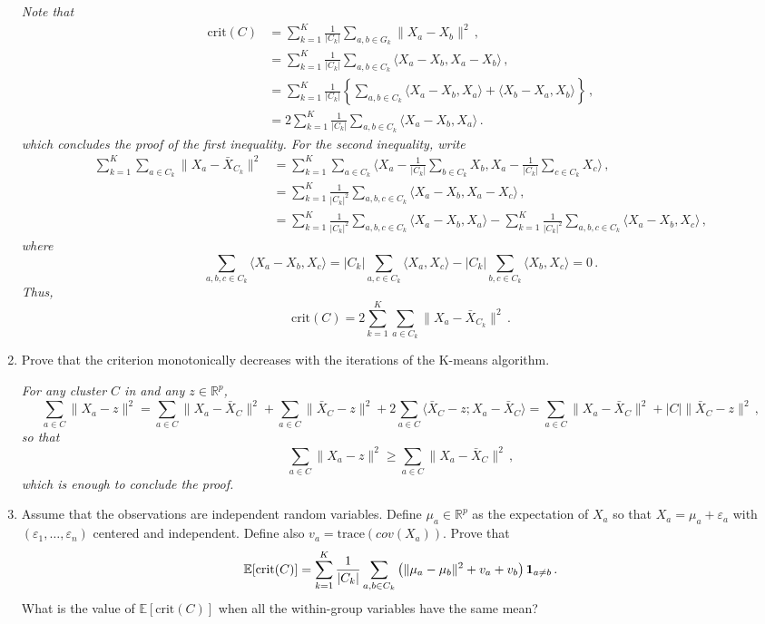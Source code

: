 \begin{enumerate}
\vspace{.2cm}

{\em
Note that 
\begin{align*}
\textrm{crit}(C) & = \sum_{k=1}^K \frac{1}{|C_k|}\sum_{a, b\in G_{k}} \| X_a-X_b \|^2\,,\\
&=\sum_{k=1}^K \frac{1}{|C_k|}\sum_{a, b\in C_{k}} \langle X_a-X_b,X_a -X_b \rangle \,,\\
&=\sum_{k=1}^K \frac{1}{|C_k|}\left\{\sum_{a, b\in C_{k}} \langle X_a-X_b,X_a \rangle + \langle X_b-X_a,X_b \rangle\right\} \,,\\
&=2\sum_{k=1}^K \frac{1}{|C_k|}\sum_{a, b\in C_{k}} \langle X_a-X_b,X_a\rangle\,.
\end{align*}
which concludes the proof of the first inequality. For the second inequality, write
\begin{align*}
\sum_{k=1}^K\sum_{a\in C_{k}}\|X_{a}-\bar{X}_{C_{k}}\|^2 & = \sum_{k=1}^K \sum_{a\in C_{k}} \langle X_a - \frac{1}{|C_k|} \sum_{b \in C_k} X_b,X_a - \frac{1}{|C_k|} \sum_{c \in C_k} X_c \rangle\,, \\
& = \sum_{k=1}^K \frac{1}{|C_k|^2}\sum_{a, b, c\in C_{k}} \langle X_a - X_b,X_a - X_c \rangle\,, \\
& = \sum_{k=1}^K \frac{1}{|C_k|^2}\sum_{a, b, c\in C_{k}} \langle X_a - X_b,X_a \rangle - \sum_{k=1}^K \frac{1}{|C_k|^2}\sum_{a, b, c\in C_{k}} \langle X_a - X_b,X_c \rangle\,,
\end{align*}
where
\[
\sum_{a, b, c\in C_{k}} \langle X_a - X_b,X_c \rangle  = |C_k| \sum_{a, c\in C_{k}} \langle X_a ,X_c \rangle - |C_k| \sum_{b, c\in C_{k}} \langle X_b ,X_c \rangle= 0\,.
\]
Thus, 
\[
\textrm{crit}(C) = 2\sum_{k=1}^K\sum_{a\in C_{k}}\|X_{a}-\bar{X}_{C_{k}}\|^2\,.
\]
}
\item Prove that the criterion monotonically decreases with the iterations of the K-means algorithm.

\vspace{.2cm}

{\em
For any cluster $C$ in and any $z\in \mathbb{R}^p$,
\[
\sum_{a\in C}\|X_{a}-z\|^2 = \sum_{a\in C}\|X_{a}-\bar{X}_{C}\|^2  + \sum_{a\in C}\|\bar{X}_{C}-z\|^2 +2\sum_{a\in C}\langle \bar{X}_{C}-z;X_{a}-\bar{X}_{C} \rangle = \sum_{a\in C}\|X_{a}-\bar{X}_{C}\|^2  + |C|\|\bar{X}_{C}-z\|^2 \,,
\]
so that 
\[
\sum_{a\in C}\|X_{a}-z\|^2 \geqslant \sum_{a\in C}\|X_{a}-\bar{X}_{C}\|^2 \,,
\]
which is enough to conclude the proof.
}
\item Assume that the observations are independent random variables. Define $\mu_{a}\in\mathbb{R}^p$ as the expectation of $X_{a}$ so that $X_{a}=\mu_{a}+\varepsilon_{a}$ with $(\varepsilon_{1},\ldots,\varepsilon_{n})$ centered and independent.  Define also $v_{a}=\textrm{trace}(cov(X_{a}))$. Prove that
\[
\mathbb{E}[\textrm{crit}(C)]= \sum_{k=1}^K{1\over |C_{k}|}\sum_{a,b\in C_{k}} \left(\|\mu_{a}-\mu_{b}\|^2+v_{a}+v_{b}\right){\bf 1}_{a\neq b}\,.
\]
What is the value of $\mathbb{E}[\textrm{crit}(C)]$ when all the within-group variables have the same mean?


\end{enumerate}
